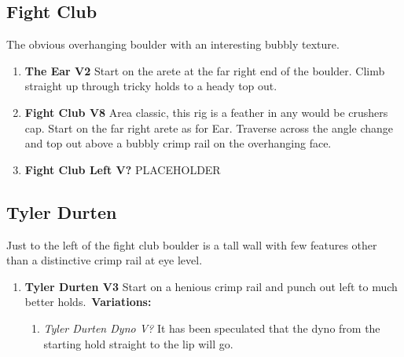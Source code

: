\subsection*{Fight Club}\label{bf:Fight Club}
The obvious overhanging boulder with an interesting bubbly texture.

\label{pt:Fight Club}
\begin{enumerate}[resume]
	\item\label{rt:The Ear} \colorbox{green!20}{\textbf{The Ear V2      } }
	\newline Start on the arete at the far right end of the boulder. Climb straight up through tricky holds to a heady top out.\
	\item\label{rt:Fight Club} \colorbox{Goldenrod!50}{\textbf{Fight Club V8      } }
	\newline Area classic, this rig is a feather in any would be crushers cap. Start on the far right arete as for Ear. Traverse across the angle change and top out above a bubbly crimp rail on the overhanging face.\
	\item\label{rt:Fight Club Left} \colorbox{black!20}{\textbf{Fight Club Left V?  } }
	\newline PLACEHOLDER\
\end{enumerate}
\subsection*{Tyler Durten}\label{bf:Tyler Durten}
Just to the left of the fight club boulder is a tall wall with few features other than a distinctive crimp rail at eye level.

\begin{enumerate}[resume]
	\item\label{rt:Tyler Durten} \colorbox{green!20}{\textbf{Tyler Durten V3 \ding{72}  } }
	\newline Start on a henious crimp rail and punch out left to much better holds.\
	\newline \textbf{Variations:}
	\begin{enumerate}
		\item\label{vr:Tyler Durten Dyno} \colorbox{black!20}{\emph{Tyler Durten Dyno V?  }  }
		\newline It has been speculated that the dyno from the starting hold straight to the lip will go.\
	\end{enumerate}
\end{enumerate}
